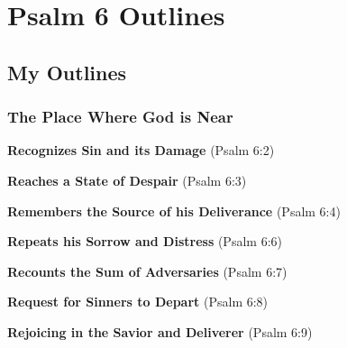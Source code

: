 \section{Psalm 6 Outlines}

\subsection{My Outlines}

\subsubsection{The Place Where God is Near}
\begin{compactenum}[I.]
    \item \textbf{Recognizes Sin and its Damage}   (Psalm 6:2)
    \item \textbf{Reaches a State of Despair}  (Psalm 6:3)
    \item \textbf{Remembers the Source of his Deliverance}  (Psalm 6:4)
    \item \textbf{Repeats his Sorrow and Distress}  (Psalm 6:6)
    \item \textbf{Recounts the Sum of Adversaries}  (Psalm 6:7)
    \item \textbf{Request for Sinners to Depart}  (Psalm 6:8)
    \item \textbf{Rejoicing in the Savior and Deliverer}  (Psalm 6:9)
\end{compactenum}

